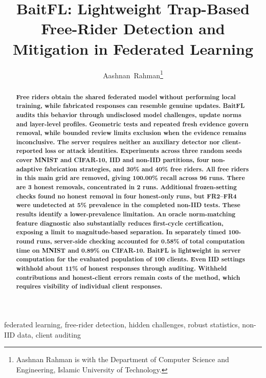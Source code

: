 \documentclass[journal]{IEEEtran}
\title{BaitFL: Lightweight Trap-Based Free-Rider Detection and Mitigation in Federated Learning}
\author{Aashnan~Rahman\thanks{Aashnan Rahman is with the Department of Computer Science and Engineering, Islamic University of Technology.}}
\makeatletter
\renewcommand{\section}{\@startsection{section}{1}{\z@}{1.5ex}{0.7ex}{\normalfont\normalsize\centering\scshape}}
\makeatother
\begin{document}
\maketitle
\raggedbottom
\setlength{\parskip}{0pt plus 2pt minus 0.5pt}
\makeatletter
\def\@textbottom{\vskip\z@ plus 6pt}
\makeatother
\setlength{\abovedisplayskip}{6pt plus 1pt minus 1pt}
\setlength{\belowdisplayskip}{6pt plus 1pt minus 1pt}
\setlength{\abovedisplayshortskip}{3pt plus 1pt minus 1pt}
\setlength{\belowdisplayshortskip}{3pt plus 1pt minus 1pt}

\begin{abstract}
\bfseries
Free riders obtain the shared federated model without performing local
training, while fabricated responses can resemble genuine updates.
BaitFL audits this behavior through undisclosed model challenges,
update norms and layer-level profiles. Geometric tests and repeated fresh
evidence govern removal, while bounded review limits exclusion when
the evidence remains inconclusive. The server requires neither an
auxiliary detector nor client-reported loss or attack identities.
Experiments across three random seeds cover MNIST and CIFAR-10, IID and
non-IID partitions, four non-adaptive fabrication strategies, and 30\%
and 40\% free riders. All free riders in this main grid are removed, giving
100.00\% recall across 96 runs. There are 3
honest removals, concentrated in 2 runs. Additional
frozen-setting checks found no honest removal in four honest-only runs,
but FR2--FR4 were undetected at 5\% prevalence in the completed non-IID
tests. These results identify a lower-prevalence limitation. An oracle
norm-matching feature diagnostic also substantially reduces first-cycle
certification, exposing a limit to magnitude-based separation. In separately
timed 100-round runs, server-side checking accounted for 0.58\% of total
computation time on MNIST and 0.89\% on CIFAR-10.
BaitFL is lightweight in server computation
for the evaluated population of 100 clients. Even IID settings withhold
about 11\% of honest responses through auditing. Withheld contributions
and honest-client errors remain costs of the method, which requires
visibility of individual client responses.
\end{abstract}

\begin{IEEEkeywords}
federated learning, free-rider detection, hidden challenges, robust statistics,
non-IID data, client auditing
\end{IEEEkeywords}

\section{Introduction}
\end{document}

